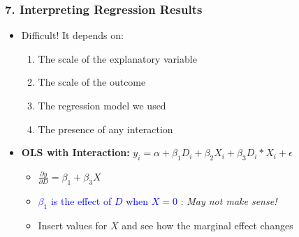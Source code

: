 \documentclass[xcolor=x11names,compress]{beamer}\usepackage[]{graphicx}\usepackage[]{color}
\renewcommand{\(}{\begin{columns}}
\renewcommand{\)}{\end{columns}}
\newcommand{\<}[1]{\begin{column}{#1}}
\renewcommand{\>}{\end{column}}
\begin{document}
\begin{frame}
\frametitle{7. Interpreting Regression Results}
\begin{itemize}
\item Difficult! It depends on:
\begin{enumerate}
\item The scale of the explanatory variable
\item The scale of the outcome
\item The regression model we used
\item The presence of any interaction
\end{enumerate}
\item \textbf{OLS with Interaction:} $y_i = \alpha + \beta_1 D_i + \beta_2 X_i + \beta_3 D_i * X_i + \epsilon$
\begin{itemize}
\item $ \frac{\partial y}{\partial D} = \beta_1 + \beta_3 X$
\item \textcolor{blue}{$\beta_1$ is the effect of $D$ when $X=0$} : \textit{May not make sense!}
\item Insert values for $X$ and see how the marginal effect changes
\end{itemize}
\end{itemize}
\end{frame}
\end{document}
